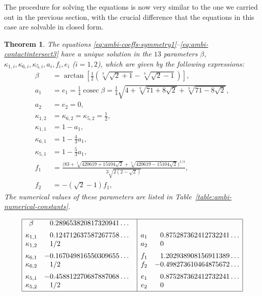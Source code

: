 \documentclass[11pt]{article}
\newtheorem{thm}{Theorem}
\begin{document}
The procedure for solving the equations is now very similar to the one we carried out in the previous section, with the crucial difference that the equations in this case are solvable in closed form.

\begin{thm}
\label{thm:ambi-uniquesolution}
The equations \eqref{eq:ambi-coeffs-symmetry1}--\eqref{eq:ambi-contactintersect3} have a unique solution in the $13$ parameters $\beta$, $\kappa_{1,i}, \kappa_{6,i}, \kappa_{5,i}, a_i, f_i, e_i$ ($i=1,2$), which are given by the following expressions:
\begin{align}
\beta &=
  \arctan\left[
\frac{1}{2} \left( \sqrt[3]{\sqrt{2}+1}- \sqrt[3]{\sqrt{2}-1}\, \right)
  \right],
\label{eq:ambi-symbolic-beta} \\
a_1 &= e_1 = \frac14 \operatorname{cosec} \beta = \frac{1}{4} \sqrt{4+\sqrt[3]{71+8 \sqrt{2}}+\sqrt[3]{71-8 \sqrt{2}}}, 
\\
a_2 &= e_2 = 0, \\
\kappa_{1,2} &= \kappa_{6,2} = \kappa_{5,2} = \frac12,
\label{eq:ambi-k62}
\\
\kappa_{1,1} &= 1-a_1,
\\
\kappa_{6,1} &=1-\frac43 a_1,
\label{eq:ambi-k61}
\\
\kappa_{5,1} &= 1-\frac53 a_1,
\\
f_1 &= 
\frac{\Big(83+\sqrt[3]{420619+15104 \sqrt{2}}+\sqrt[3]{420619-15104 \sqrt{2}}\Big)^{1/4}}{3 \sqrt{2 \left(2-\sqrt{2}\right)}}, 
\label{eq:ambi-f1}
\\
f_2 &=
 -(\sqrt{2}-1)f_1,
 \label{eq:ambi-f2}
\end{align}
The numerical values of these parameters are listed in Table~\ref{table:ambi-numerical-constants}. 
\end{thm}

\begin{table}
$$
\begin{array}{|cl|cl|}
\hline
\beta & \phantom{-}0.289653820817320941\ldots  \ \ & \ \ & 
\\[5pt]
\kappa_{1,1} & \phantom{-}0.124712637587267758\ldots  & a_1 & \phantom{-}0.875287362412732241\ldots
\\
\kappa_{1,2} & \phantom{-}1/2 & a_2 & \phantom{-}0
\\[5pt]
\kappa_{6,1} & -0.167049816550309655  \ldots & f_1 & \phantom{-}1.202 938 908 156 911 389\ldots
\\
\kappa_{6,2} & \phantom{-}1/2  & f_2 & -0.498 273 610 464 875 672 \ldots
\\[5pt]
\kappa_{5,1} & -0.458812270687887068\ldots & e_1 & 
\phantom{-}0.875 287 362 412 732 241\ldots
\\
\kappa_{5,2} & \phantom{-}1/2 & e_2 & 
\phantom{-}0 
\\[2pt] \hline
\end{array}
$$
\caption{Numerical values for the constants in our construction.}
\label{table:ambi-numerical-constants}
\end{table}
\end{document}
